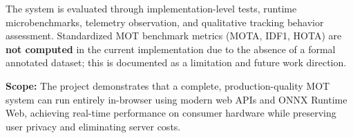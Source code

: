 \vspace{0.5cm}

\noindent The system is evaluated through implementation-level tests, runtime microbenchmarks, telemetry observation, and qualitative tracking behavior assessment. Standardized MOT benchmark metrics (MOTA, IDF1, HOTA) are \textbf{not computed} in the current implementation due to the absence of a formal annotated dataset; this is documented as a limitation and future work direction.

\vspace{0.5cm}

\noindent \textbf{Scope:} The project demonstrates that a complete, production-quality MOT system can run entirely in-browser using modern web APIs and ONNX Runtime Web, achieving real-time performance on consumer hardware while preserving user privacy and eliminating server costs.